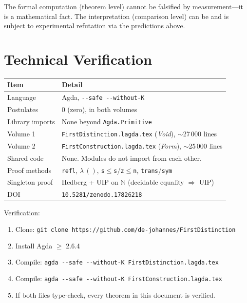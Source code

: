 \documentclass[11pt,a4paper]{article}
\theoremstyle{definition}
\begin{document}
\noindent The formal computation (theorem level) cannot be falsified by
measurement---it is a mathematical fact.  The interpretation (comparison
level) can be and is subject to experimental refutation via the predictions
above.

\section{Technical Verification}
\label{sec:technical}

\begin{center}
\small
\renewcommand{\arraystretch}{1.3}
\begin{tabular}{@{}ll@{}}
\toprule
\textbf{Item} & \textbf{Detail} \\
\midrule
Language               & Agda, \texttt{-{}-safe -{}-without-K} \\
Postulates             & 0 (zero), in both volumes \\
Library imports        & None beyond \texttt{Agda.Primitive} \\
Volume 1               & \texttt{FirstDistinction.lagda.tex} (\textit{Void}), $\sim$27\,000 lines \\
Volume 2               & \texttt{FirstConstruction.lagda.tex} (\textit{Form}), $\sim$25\,000 lines \\
Shared code            & None.  Modules do not import from each other. \\
Proof methods          & \texttt{refl}, $\lambda\,()$, \texttt{s$\le$s}/\texttt{z$\le$n}, \texttt{trans}/\texttt{sym} \\
Singleton proof        & Hedberg + UIP on $\mathbb{N}$ (decidable equality $\Rightarrow$ UIP) \\
DOI                    & \texttt{10.5281/zenodo.17826218} \\
\bottomrule
\end{tabular}
\end{center}

\medskip
\noindent Verification:
\begin{enumerate}[nosep]
  \item Clone: \texttt{git clone https://github.com/de-johannes/FirstDistinction}
  \item Install Agda $\ge$ 2.6.4
  \item Compile: \texttt{agda -{}-safe -{}-without-K FirstDistinction.lagda.tex}
  \item Compile: \texttt{agda -{}-safe -{}-without-K FirstConstruction.lagda.tex}
  \item If both files type-check, every theorem in this document is verified.
\end{enumerate}
\end{document}
